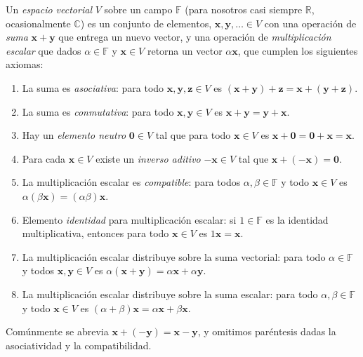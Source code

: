   \begin{definition}
    \label{def:espacio-vectorial}
    Un \emph{espacio vectorial} \(V\)
    sobre un campo \(\mathbb{F}\)
    (para nosotros casi siempre \(\mathbb{R}\),
     ocasionalmente \(\mathbb{C}\))
    es un conjunto de elementos,
    \(\mathbf{x}, \mathbf{y}, \dotsc \in V\) con una operación de \emph{suma}
    \(\mathbf{x} + \mathbf{y}\) que entrega un nuevo vector,
    y una operación de \emph{multiplicación escalar}
    que dados \(\alpha \in \mathbb{F}\) y \(\mathbf{x} \in V\)
    retorna un vector \(\alpha \mathbf{x}\),
    que cumplen los siguientes axiomas:
    \begin{enumerate}
    \item
      La suma es \emph{asociativa}:
      para todo \(\mathbf{x}, \mathbf{y}, \mathbf{z} \in V\)
      es \((\mathbf{x} + \mathbf{y}) + \mathbf{z}
              = \mathbf{x} + (\mathbf{y} + \mathbf{z})\).
    \item
      La suma es \emph{conmutativa}:
      para todo \(\mathbf{x}, \mathbf{y} \in V\)
      es \(\mathbf{x} + \mathbf{y} = \mathbf{y} + \mathbf{x}\).
    \item
      Hay un \emph{elemento neutro} \(\mathbf{0} \in V\)
      tal que para todo \(\mathbf{x} \in V\)
      es \(\mathbf{x} + \mathbf{0} = \mathbf{0} + \mathbf{x} = \mathbf{x}\).
    \item
      Para cada \(\mathbf{x} \in V\) existe un \emph{inverso aditivo}
      \(- \mathbf{x} \in V\)
      tal que \(\mathbf{x} + (- \mathbf{x}) = \mathbf{0}\).
    \item
      La multiplicación escalar es \emph{compatible}:
      para todos \(\alpha, \beta \in \mathbb{F}\)
      y todo \(\mathbf{x} \in V\)
      es \(\alpha (\beta \mathbf{x}) = (\alpha \beta) \mathbf{x}\).
    \item
      Elemento \emph{identidad} para multiplicación escalar:
      si \(1 \in \mathbb{F}\) es la identidad multiplicativa,
      entonces para todo \(\mathbf{x} \in V\) es \(1 \mathbf{x} = \mathbf{x}\).
    \item
      La multiplicación escalar distribuye sobre la suma vectorial:
      para todo \(\alpha \in \mathbb{F}\)
      y todos \(\mathbf{x}, \mathbf{y} \in V\)
      es \(\alpha (\mathbf{x} + \mathbf{y})
             = \alpha \mathbf{x} + \alpha \mathbf{y}\).
    \item
      La multiplicación escalar distribuye sobre la suma escalar:
      para todo \(\alpha, \beta \in \mathbb{F}\)
      y todo \(\mathbf{x} \in V\)
      es \((\alpha + \beta) \mathbf{x}
              = \alpha \mathbf{x} + \beta \mathbf{x}\).
    \end{enumerate}
  \end{definition}
  Comúnmente
  se abrevia \(\mathbf{x} + (- \mathbf{y}) = \mathbf{x} - \mathbf{y}\),
  y omitimos paréntesis dadas la asociatividad y la compatibilidad.

